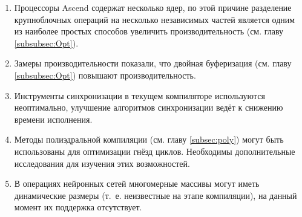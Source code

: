 \begin{enumerate}
    \item Процессоры Ascend содержат несколько ядер, по этой причине разделение
          крупноблочных операций на несколько независимых частей является одним
          из наиболее простых способов увеличить производительность (см.
          главу \ref{subsubsec:Opt}).
    \item Замеры производительности показали, что двойная буферизация (см.
          главу \ref{subsubsec:Opt}) повышают производительность.
    \item Инструменты синхронизации в текущем компиляторе используются
          неоптимально, улучшение алгоритмов синхронизации ведёт к снижению
          времени исполнения.
    \item Методы полиэдральной компиляции (см. главу \ref{subsec:poly})
          могут быть использованы для оптимизации гнёзд циклов. Необходимы
          дополнительные исследования для изучения этих возможностей.
    \item В операциях нейронных сетей многомерные массивы могут иметь динамические
          размеры (т.~е. неизвестные на этапе компиляции), на данный момент
          их поддержка отсутствует.
\end{enumerate}

\newpage
